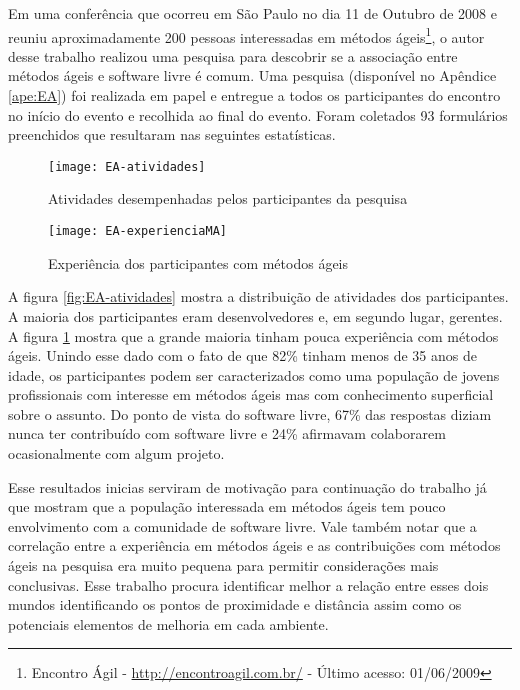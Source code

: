 Em uma conferência que ocorreu em São Paulo no dia 11 de Outubro de
2008 e reuniu aproximadamente 200 pessoas interessadas em métodos
ágeis\footnote{Encontro Ágil - \url{http://encontroagil.com.br/} -
  Último acesso: 01/06/2009}, o autor desse trabalho realizou uma
pesquisa para descobrir se a associação entre métodos ágeis e software
livre é comum. Uma pesquisa (disponível no Apêndice \ref{ape:EA}) foi
realizada em papel e entregue a todos os participantes do encontro no
início do evento e recolhida ao final do evento. Foram coletados 93
formulários preenchidos que resultaram nas seguintes estatísticas.


\begin{figure}[htb]
  \begin{minipage}[t]{0.5\linewidth}
    \centering
    \texttt{[image: EA-atividades]}
    \caption{Atividades desempenhadas pelos participantes da pesquisa}
    \label{fig:EA-atividades}
  \end{minipage}
  \begin{minipage}[t]{0.5\linewidth}
    \centering
    \texttt{[image: EA-experienciaMA]}
    \caption{Experiência dos participantes com métodos ágeis}
    \label{fig:EA-experienciaMA}
  \end{minipage}
\end{figure}

A figura \ref{fig:EA-atividades} mostra a distribuição de atividades
dos participantes. A maioria dos participantes eram desenvolvedores e,
em segundo lugar, gerentes. A figura \ref{fig:EA-experienciaMA} mostra
que a grande maioria tinham pouca experiência com métodos
ágeis. Unindo esse dado com o fato de que 82\% tinham menos de 35 anos
de idade, os participantes podem ser caracterizados como uma população
de jovens profissionais com interesse em métodos ágeis mas com
conhecimento superficial sobre o assunto. Do ponto de vista do
software livre, 67\% das respostas diziam nunca ter contribuído com
software livre e 24\% afirmavam colaborarem ocasionalmente com algum
projeto.

Esse resultados inicias serviram de motivação para continuação do
trabalho já que mostram que a população interessada em métodos ágeis
tem pouco envolvimento com a comunidade de software livre. Vale também
notar que a correlação entre a experiência em métodos ágeis e as
contribuições com métodos ágeis na pesquisa era muito pequena para
permitir considerações mais conclusivas. Esse trabalho procura
identificar melhor a relação entre esses dois mundos identificando os
pontos de proximidade e distância assim como os potenciais elementos
de melhoria em cada ambiente.

